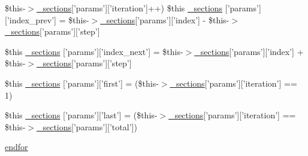 \begin{DoxyCompactItemize}
\$this-\/$>$\hyperlink{_06_06127_05_06_0612781687_05pkgelementindex_8tpl_8php_a9e3d26b39edfe29c3f29b8035ef33828}{\-\_\-sections}\mbox{[}'params'\mbox{]}\mbox{[}'iteration'\mbox{]}++) \*
\$this \hyperlink{34d6fa4bfd5eef6424a9ddc74a166350_2_06_06-14_05_06_06-1407541581_05method_8tpl_8php_a34b96969934c8f86c7f8b7c3343f08dc}{\-\_\-sections} \mbox{[}'params'\mbox{]}\mbox{[}'index\-\_\-prev'\mbox{]} = \$this-\/$>$\hyperlink{_06_06127_05_06_0612781687_05pkgelementindex_8tpl_8php_a9e3d26b39edfe29c3f29b8035ef33828}{\-\_\-sections}\mbox{[}'params'\mbox{]}\mbox{[}'index'\mbox{]} -\/ \$this-\/$>$\hyperlink{_06_06127_05_06_0612781687_05pkgelementindex_8tpl_8php_a9e3d26b39edfe29c3f29b8035ef33828}{\-\_\-sections}\mbox{[}'params'\mbox{]}\mbox{[}'step'\mbox{]}
\item 
\$this \hyperlink{34d6fa4bfd5eef6424a9ddc74a166350_2_06_06-14_05_06_06-1407541581_05method_8tpl_8php_ae96d763cc26cf8d9dee9bc4d055b1b03}{\-\_\-sections} \mbox{[}'params'\mbox{]}\mbox{[}'index\-\_\-next'\mbox{]} = \$this-\/$>$\hyperlink{_06_06127_05_06_0612781687_05pkgelementindex_8tpl_8php_a9e3d26b39edfe29c3f29b8035ef33828}{\-\_\-sections}\mbox{[}'params'\mbox{]}\mbox{[}'index'\mbox{]} + \$this-\/$>$\hyperlink{_06_06127_05_06_0612781687_05pkgelementindex_8tpl_8php_a9e3d26b39edfe29c3f29b8035ef33828}{\-\_\-sections}\mbox{[}'params'\mbox{]}\mbox{[}'step'\mbox{]}
\item 
\$this \hyperlink{34d6fa4bfd5eef6424a9ddc74a166350_2_06_06-14_05_06_06-1407541581_05method_8tpl_8php_a87402c7a624b02674187ef8341a030ef}{\-\_\-sections} \mbox{[}'params'\mbox{]}\mbox{[}'first'\mbox{]} = (\$this-\/$>$\hyperlink{_06_06127_05_06_0612781687_05pkgelementindex_8tpl_8php_a9e3d26b39edfe29c3f29b8035ef33828}{\-\_\-sections}\mbox{[}'params'\mbox{]}\mbox{[}'iteration'\mbox{]} == 1)
\item 
\$this \hyperlink{34d6fa4bfd5eef6424a9ddc74a166350_2_06_06-14_05_06_06-1407541581_05method_8tpl_8php_a876ec257e66073afaa19ca5548ecb9a1}{\-\_\-sections} \mbox{[}'params'\mbox{]}\mbox{[}'last'\mbox{]} = (\$this-\/$>$\hyperlink{_06_06127_05_06_0612781687_05pkgelementindex_8tpl_8php_a9e3d26b39edfe29c3f29b8035ef33828}{\-\_\-sections}\mbox{[}'params'\mbox{]}\mbox{[}'iteration'\mbox{]} == \$this-\/$>$\hyperlink{_06_06127_05_06_0612781687_05pkgelementindex_8tpl_8php_a9e3d26b39edfe29c3f29b8035ef33828}{\-\_\-sections}\mbox{[}'params'\mbox{]}\mbox{[}'total'\mbox{]})
\item 
\hyperlink{34d6fa4bfd5eef6424a9ddc74a166350_2_06_06-14_05_06_06-1407541581_05method_8tpl_8php_ae8fdc27183f296411bac00ed522ee1ac}{endfor}
\item 

\end{DoxyCompactItemize}
